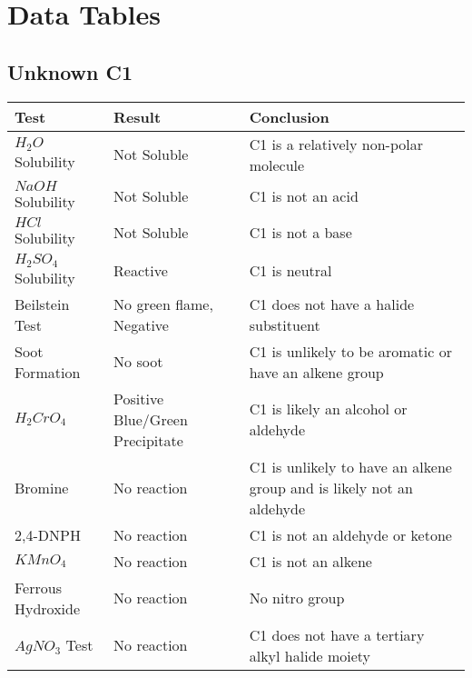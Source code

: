 \documentclass[11pt]{article}
\begin{document}
	
	
	\pagebreak
	\section{Data Tables}
	\subsection{Unknown C1}
	\begin{table}[h]
		\raggedright
		\begin{tabular}{ l  p{3.0cm} p{5.4cm} } 
			\toprule
			\textbf{Test} & \textbf{Result} & \textbf{Conclusion} \\\midrule
			
			$H_2O$ Solubility & Not Soluble & C1 is a relatively non-polar molecule \\\hline
			
			$NaOH$ Solubility & Not Soluble & C1 is not an acid \\\hline
			
			$HCl$ Solubility & Not Soluble & C1 is not a base  \\\hline
			
			$H_2SO_4$ Solubility & Reactive & C1 is neutral \\\hline
			
			Beilstein Test & No green flame, Negative & C1 does not have a halide substituent \\\hline
			
			Soot Formation & No soot & C1 is unlikely to be aromatic or have an alkene group \\\hline
			
			$H_2CrO_4$ & Positive Blue/Green Precipitate & C1 is likely an alcohol or aldehyde \\\hline
			
			Bromine & No reaction & C1 is unlikely to have an alkene group and is likely not an aldehyde \\\hline 
			
			2,4-DNPH & No reaction & C1 is not an aldehyde or ketone \\\hline 
			
			$KMnO_4$ & No reaction & C1 is not an alkene \\\hline  
			
			Ferrous Hydroxide & No reaction & No nitro group \\\hline
			
			$AgNO_3$ Test & No reaction & C1 does not have a tertiary alkyl halide moiety \\\hline 
			

\end{tabular}
\end{table}
\end{document}
